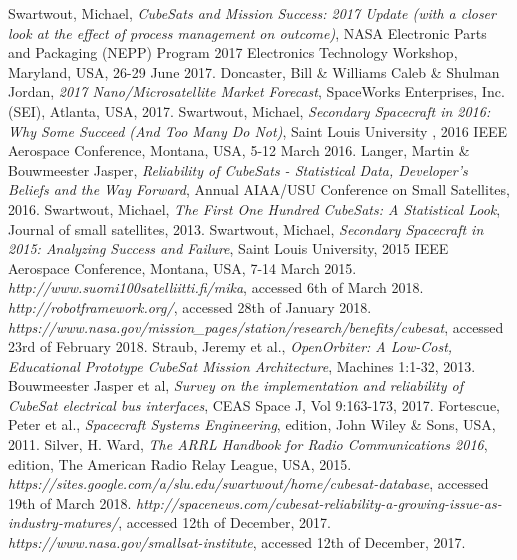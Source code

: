 \documentclass[english,12pt,a4paper,pdftex,elec,utf8]{aaltothesis}
\begin{document}
\begin{thebibliography}{99}
 Swartwout, Michael,
  \textit{CubeSats and Mission Success: 2017 Update (with a closer look at the effect of process management on outcome)}, NASA Electronic Parts and Packaging (NEPP) Program
2017 Electronics Technology Workshop, Maryland, USA, 26-29 June 2017.
 Doncaster, Bill \& Williams Caleb \& Shulman Jordan,
  \textit{2017 Nano/Microsatellite Market Forecast}, SpaceWorks Enterprises, Inc. (SEI), Atlanta, USA, 2017.
 Swartwout, Michael,
  \textit{Secondary Spacecraft in 2016: Why Some Succeed (And Too Many Do Not)}, Saint Louis University , 2016 IEEE Aerospace Conference, Montana, USA,  5-12 March 2016. 
 Langer, Martin \& Bouwmeester Jasper,
  \textit{Reliability of CubeSats - Statistical Data, Developer's Beliefs and the Way Forward},  Annual AIAA/USU Conference on Small Satellites, 2016.
 Swartwout, Michael,
  \textit{The First One Hundred CubeSats: A Statistical Look}, Journal of small satellites, 2013.
 Swartwout, Michael,
  \textit{Secondary Spacecraft in 2015: Analyzing Success and Failure}, Saint Louis University, 2015 IEEE Aerospace Conference, Montana, USA, 7-14 March 2015. 
  \textit{http://www.suomi100satelliitti.fi/mika}, accessed 6th of March 2018.
  \textit{http://robotframework.org/}, accessed 28th of January 2018.
  \textit{https://www.nasa.gov/mission\_pages/station/research/benefits/cubesat}, accessed 23rd of February 2018.
 Straub, Jeremy et al.,
  \textit{OpenOrbiter: A Low-Cost, Educational Prototype CubeSat Mission Architecture}, Machines 1:1-32, 2013.
 Bouwmeester Jasper et al,
  \textit{Survey on the implementation and reliability of CubeSat electrical bus interfaces}, CEAS Space J, Vol 9:163-173, 2017.
 Fortescue, Peter et al.,
  \textit{Spacecraft Systems Engineering},  edition, John Wiley \& Sons, USA, 2011.
 Silver, H. Ward,
   \textit{The ARRL Handbook for Radio Communications 2016},  edition, The American Radio Relay League, USA, 2015.
  \textit{https://sites.google.com/a/slu.edu/swartwout/home/cubesat-database}, accessed 19th of March 2018. 
  \textit{http://spacenews.com/cubesat-reliability-a-growing-issue-as-industry-matures/}, accessed 12th of December, 2017. 
  \textit{https://www.nasa.gov/smallsat-institute}, accessed 12th of December, 2017.

\end{thebibliography}
\end{document}
